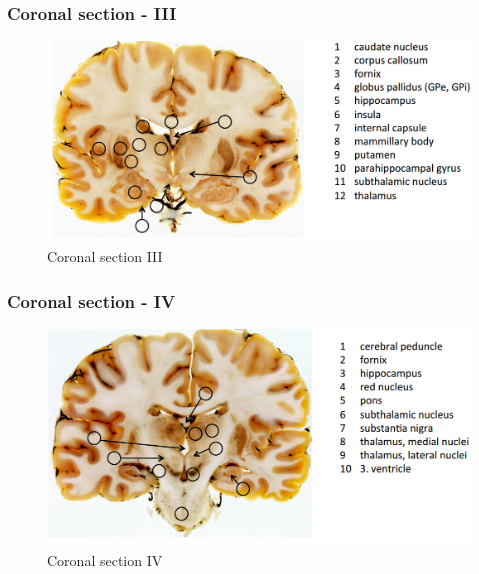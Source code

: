\documentclass[12pt,article,oneside,a4paper]{memoir}
\begin{document}
\subsubsection{Coronal section - III}
\begin{figure}[H]
	\centering
  	\includegraphics[width=\linewidth]{imgs/coronal-section-III.png}
	\caption{Coronal section III}
  	\label{fig:coronalSectionIII}
\end{figure}

\subsubsection{Coronal section - IV}
\begin{figure}[H]
	\centering
  	\includegraphics[width=\linewidth]{imgs/coronal-section-IV.png}
	\caption{Coronal section IV}
  	\label{fig:coronalSectionIV}
\end{figure}
\end{document}
